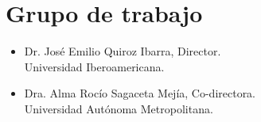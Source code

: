 \section {Grupo de trabajo}
\begin{itemize}
	\item Dr. José Emilio Quiroz Ibarra, Director.\\
Universidad Iberoamericana.
	\item Dra. Alma Rocío Sagaceta Mejía, Co-directora.\\
Universidad Autónoma Metropolitana.
\end{itemize}